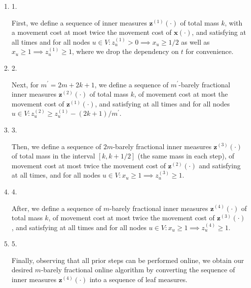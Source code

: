 \documentclass[10pt,a4paper]{article}
\begin{document}
\begin{enumerate}


\item[] 
1. 


First, we define a sequence of inner measures ${\mathbf{z}}^{(1)}(\cdot)$ of total mass $k$, with a movement cost at most twice the movement cost of ${\boldsymbol{x}}(\cdot)$, and satisfying at all times and for all nodes $u\in V\colon z_{u}^{(1)}>0\implies x_{u}\geq 1/2$ as well as $x_{u}\geq 1\implies z_{u}^{(1)}\geq 1$, where we drop the dependency on $t$ for convenience.\par





\item[] 
2. 


Next, for $m^{\prime}=2m+2k+1$, we define a sequence of $m^{\prime}$-barely fractional inner measures ${\mathbf{z}}^{(2)}(\cdot)$ of total mass $k$, of movement cost at most the movement cost of ${\mathbf{z}}^{(1)}(\cdot)$, and satisfying at all times and for all nodes $u\in V\colon z^{(2)}_{u}\geq z^{(1)}_{u}-(2k+1)/m^{\prime}$.\par





\item[] 
3. 


Then, we define a sequence of $2m$-barely fractional inner measures ${\mathbf{z}}^{(3)}(\cdot)$ of total mass in the interval $[k,k+1/2]$ (the same mass in each step), of movement cost at most twice the movement cost of ${\mathbf{z}}^{(2)}(\cdot)$ and satisfying at all times, and for all nodes $u\in V\colon x_{u}\geq 1\implies z_{u}^{(3)}\geq 1$.\par





\item[] 
4. 


After, we define a sequence of $m$-barely fractional inner measures ${\mathbf{z}}^{(4)}(\cdot)$ of total mass $k$, of movement cost at most twice the movement cost of ${\mathbf{z}}^{(3)}(\cdot)$, and satisfying at all times and for all nodes $u\in V\colon x_{u}\geq 1\implies z_{u}^{(4)}\geq 1$.\par





\item[] 
5. 


Finally, observing that all prior steps can be performed online, we obtain our desired $m$-barely fractional online algorithm by converting the sequence of inner measures ${\mathbf{z}}^{(4)}(\cdot)$ into a sequence of leaf measures.\par





\end{enumerate}
\end{document}
